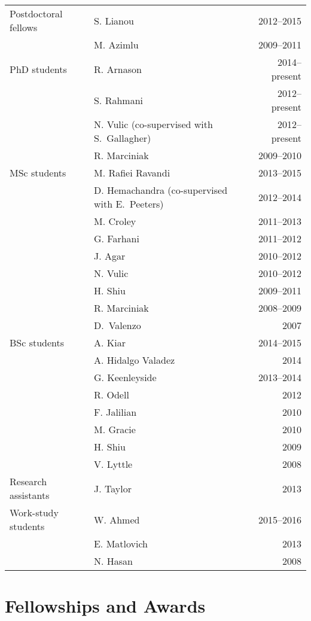 \documentclass[12pt]{article}
\begin{document}
\begin{tabularx}{\textwidth}{p{5cm}Xr}
Postdoctoral fellows 
& S. Lianou & 2012--2015\\
& M. Azimlu & 2009--2011\\
PhD students 
&  R. Arnason & 2014--present\\
&S. Rahmani& 2012--present \\
&N. Vulic (co-supervised with S.\ Gallagher) & 2012--present \\
&R. Marciniak & 2009--2010 \\
MSc students 
& M. Rafiei Ravandi& 2013--2015\\
& D. Hemachandra (co-supervised with E.\ Peeters)& 2012--2014\\
& M. Croley& 2011--2013\\
& G. Farhani& 2011--2012\\
 & J. Agar& 2010--2012\\
& N. Vulic& 2010--2012\\
& H. Shiu& 2009--2011\\
& R. Marciniak& 2008--2009\\
& D.\ Valenzo& 2007\\
BSc students
& A. Kiar & 2014--2015\\
& A. Hidalgo Valadez & 2014\\
& G. Keenleyside& 2013--2014\\
& R. Odell& 2012\\
& F. Jalilian& 2010\\
& M. Gracie& 2010\\
& H. Shiu& 2009\\
& V. Lyttle& 2008\\
Research assistants 
& J. Taylor& 2013\\
Work-study students
& W. Ahmed & 2015--2016\\
& E. Matlovich& 2013\\
& N. Hasan& 2008\\
\end{tabularx}

\section{Fellowships and Awards}
\end{document}
